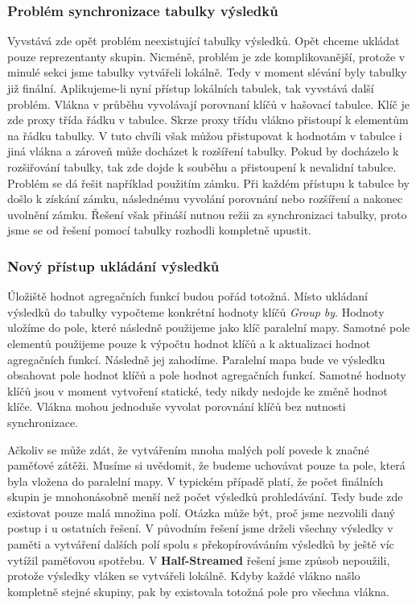 \subsubsection{Problém synchronizace tabulky výsledků}

Vyvstává zde opět problém neexistující tabulky výsledků.
Opět chceme ukládat pouze reprezentanty skupin.
Nicméně, problém je zde komplikovanější, protože v minulé sekci jsme tabulky vytvářeli lokálně.
Tedy v moment slévání byly tabulky již finální. 
Aplikujeme-li nyní přístup lokálních tabulek, tak vyvstává další problém.
Vlákna v průběhu vyvolávají porovnaní klíčů v hašovací tabulce.
Klíč je zde proxy třída řádku v tabulce.
Skrze proxy třídu vlákno přistoupí k elementům na řádku tabulky.
V tuto chvíli však můžou přistupovat k hodnotám v tabulce i jiná vlákna a zároveň může docházet k rozšíření tabulky.
Pokud by docházelo k rozšiřování tabulky, tak zde dojde k souběhu a přistoupení k nevalidní tabulce.
Problém se dá řešit například použitím zámku.
Při každém přístupu k tabulce by došlo k získání zámku, následnému vyvolání porovnání nebo rozšíření a nakonec uvolnění zámku.
Řešení však přináší nutnou režii za synchronizaci tabulky, proto jsme se od řešení pomocí tabulky rozhodli kompletně upustit.

\subsubsection{Nový přístup ukládání výsledků}

Úložiště hodnot agregačních funkcí budou pořád totožná.
Místo ukládaní výsledků do tabulky vypočteme konkrétní hodnoty klíčů \textit{Group by}.
Hodnoty uložíme do pole, které následně použijeme jako klíč paralelní mapy.  
Samotné pole elementů použijeme pouze k výpočtu hodnot klíčů a k aktualizaci hodnot agregačních funkcí.
Následně jej zahodíme.
Paralelní mapa bude ve výsledku obsahovat pole hodnot klíčů a pole hodnot agregačních funkcí.
Samotné hodnoty klíčů jsou v moment vytvoření statické, tedy nikdy nedojde ke změně hodnot klíče.
Vlákna mohou jednoduše vyvolat porovnání klíčů bez nutnosti synchronizace.

Ačkoliv se může zdát, že vytvářením mnoha malých polí povede k značné paměťové zátěži.
Musíme si uvědomit, že budeme uchovávat pouze ta pole, která byla vložena do paralelní mapy.
V typickém případě platí, že počet finálních skupin je mnohonásobně menší než počet výsledků prohledávání.
Tedy bude zde existovat pouze malá množina polí.
Otázka může být, proč jsme nezvolili daný postup i u ostatních řešení.
V původním řešení jsme drželi všechny výsledky v paměti a vytváření dalších polí spolu s překopírováváním výsledků by ještě víc vytížil paměťovou spotřebu.
V \textbf{Half-Streamed} řešení jsme způsob nepoužili, protože výsledky vláken se vytvářeli lokálně.
Kdyby každé vlákno našlo kompletně stejné skupiny, pak by existovala totožná pole pro všechna vlákna.

